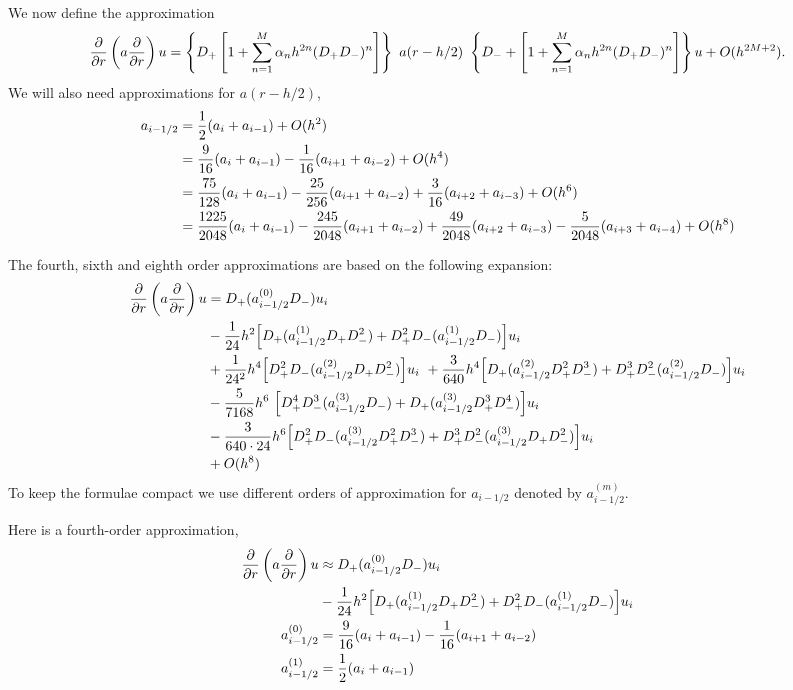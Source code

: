 \documentclass[10pt]{article}
\begin{document}
We now define the approximation
\[
{\partial \over \partial r}\left( a {\partial \over \partial r}\right) u =
\left\{ D_+\left[ 1 + \sum_{n=1}^{M}  \alpha_n h^{2n} (D_+D_-)^n \right]\right\}
   ~a(r-h/2)~ \left\{ D_-+\left[ 1 + \sum_{n=1}^{M}  \alpha_n h^{2n} (D_+D_-)^n \right]\right\} u + O(h^{2M+2}).
\]
We will also need approximations for $a(r-h/2)$,
\begin{align*}
     a_{i-1/2} &= {1\over2} ( a_{i} + a_{i-1} ) + O(h^2) \\
               &= {9\over16} ( a_{i} + a_{i-1} ) -{1\over16} ( a_{i+1} + a_{i-2} ) + O(h^4) \\
               &= {75\over128} ( a_{i} + a_{i-1} ) -{25\over256} ( a_{i+1} + a_{i-2} )
                                                 +{3\over16} ( a_{i+2} + a_{i-3} ) + O(h^6) \\
               &= {1225\over2048} ( a_{i} + a_{i-1} ) -{245\over2048} ( a_{i+1} + a_{i-2} )
                 +{49\over2048} ( a_{i+2} + a_{i-3} ) -{5\over2048} ( a_{i+3} + a_{i-4} ) + O(h^8) \\
\end{align*}


The fourth, sixth and eighth order approximations are based on the following expansion:
\begin{align*}
{\partial \over \partial r}\left( a {\partial \over \partial r}\right) u &=
      D_+( a_{i-1/2}^{(0)} D_-) u_i \\
     & - {1\over 24} h^2\Big[ D_+( a_{i-1/2}^{(1)} D_+D_-^2) + D_+^2D_-( a_{i-1/2}^{(1)} D_-) \Big] u_i \\
     & + {1\over 24^2} h^4 \Big[ D_+^2D_-( a_{i-1/2}^{(2)} D_+D_-^2) \Big] u_i
         ~+ {3\over 640} h^4\Big[ D_+( a_{i-1/2}^{(2)} D_+^2D_-^3) + D_+^3D_-^2( a_{i-1/2}^{(2)} D_-) \Big] u_i \\
     & -{5 \over 7168} h^6~ \Big[ D_+^4D_-^3( a_{i-1/2}^{(3)} D_- ) + D_+( a_{i-1/2}^{(3)} D_+^3D_-^4) \Big] u_i \\
     & -{3\over 640\cdot24} h^6\Big[ D_+^2D_-( a_{i-1/2}^{(3)} D_+^2D_-^3) 
                + D_+^3D_-^2( a_{i-1/2}^{(3)} D_+D_-^2)  \Big] u_i \\
     & + O(h^8)
\end{align*}
To keep the formulae compact we use different orders of approximation for $a_{i-1/2}$ denoted by $a_{i-1/2}^{(m)}$.

Here is a fourth-order approximation,
\begin{align*}
 {\partial \over \partial r}\left( a {\partial \over \partial r}\right) u &\approx
    D_+( a_{i-1/2}^{(0)} D_-) u_i \\
     & - {1\over 24} h^2\Big[ D_+( a_{i-1/2}^{(1)} D_+D_-^2) + D_+^2D_-( a_{i-1/2}^{(1)} D_-) \Big] u_i \\
   a_{i-1/2}^{(0)} &= {9\over16} ( a_{i} + a_{i-1} ) -{1\over16} ( a_{i+1} + a_{i-2} ) \\
   a_{i-1/2}^{(1)} &= {1\over2} ( a_{i} + a_{i-1} )
\end{align*}
\end{document}
